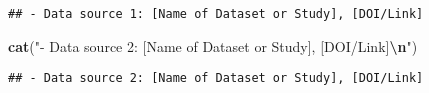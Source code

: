 \documentclass[
]{article}
\newenvironment{Shaded}{\begin{snugshade}}{\end{snugshade}}
\newcommand{\FunctionTok}[1]{\textcolor[rgb]{0.13,0.29,0.53}{\textbf{#1}}}
\newcommand{\NormalTok}[1]{#1}
\newcommand{\SpecialCharTok}[1]{\textcolor[rgb]{0.81,0.36,0.00}{\textbf{#1}}}
\newcommand{\StringTok}[1]{\textcolor[rgb]{0.31,0.60,0.02}{#1}}
\begin{document}
\begin{verbatim}
## - Data source 1: [Name of Dataset or Study], [DOI/Link]
\end{verbatim}

\begin{Shaded}
\begin{Highlighting}[]
\FunctionTok{cat}\NormalTok{(}\StringTok{"{-} Data source 2: [Name of Dataset or Study], [DOI/Link]}\SpecialCharTok{\textbackslash{}n}\StringTok{"}\NormalTok{)}
\end{Highlighting}
\end{Shaded}

\begin{verbatim}
## - Data source 2: [Name of Dataset or Study], [DOI/Link]
\end{verbatim}
\end{document}
